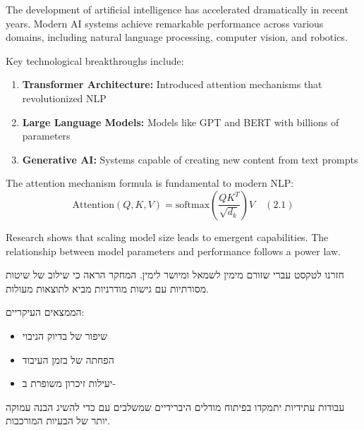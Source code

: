 \documentclass{hebrew-academic-template}
\begin{document}
The development of artificial intelligence has accelerated dramatically in recent years. Modern AI systems achieve remarkable performance across various domains, including natural language processing, computer vision, and robotics.

Key technological breakthroughs include:
\begin{enumerate}
\item \textbf{Transformer Architecture:} Introduced attention mechanisms that revolutionized NLP
\item \textbf{Large Language Models:} Models like GPT and BERT with billions of parameters  
\item \textbf{Generative AI:} Systems capable of creating new content from text prompts
\end{enumerate}

The attention mechanism formula is fundamental to modern NLP:
$$\text{Attention}(Q,K,V) = \text{softmax}\left(\frac{QK^T}{\sqrt{d_k}}\right)V \quad (2.1)$$

Research shows that scaling model size leads to emergent capabilities. The relationship between model parameters and performance follows a power law.



חזרנו לטקסט עברי שזורם מימין לשמאל ומיושר לימין. המחקר הראה כי שילוב של שיטות  מסורתיות עם גישות  מודרניות מביא לתוצאות מעולות.

הממצאים העיקריים:
\begin{itemize}
\item שיפור של  בדיוק הניבוי
\item הפחתה של  בזמן העיבוד  
\item יעילות זיכרון משופרת ב-
\end{itemize}

עבודות עתידיות יתמקדו בפיתוח מודלים היברידיים שמשלבים  עם  כדי להשיג הבנה עמוקה יותר של הבעיות המורכבות.


\newpage
\printenglishbibliography
\end{document}
